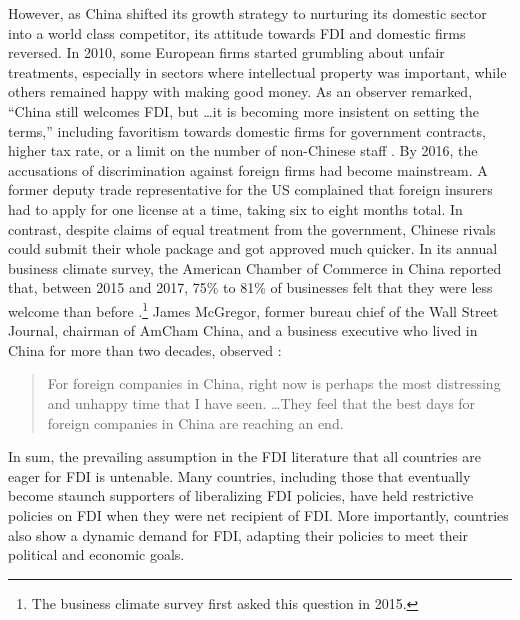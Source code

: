 However, as China shifted its growth strategy to nurturing its domestic sector
into a world class competitor, its attitude towards FDI and domestic firms
reversed. In 2010, some European firms started grumbling about unfair
treatments, especially in sectors where intellectual property was important,
while others remained happy with making good money. As an observer remarked,
``China still welcomes FDI, but \ldots it is becoming more insistent on setting
the terms,'' including favoritism towards domestic firms for government
contracts, higher tax rate, or a limit on the number of non-Chinese staff
\citep{Grant2010}. By 2016, the accusations of discrimination against foreign
firms had become mainstream. A former deputy trade representative for the US
complained that foreign insurers had to apply for one license at a time, taking
six to eight months total. In contrast, despite claims of equal treatment from
the government, Chinese rivals could submit their whole package and got approved
much quicker. In its annual business climate survey, the American Chamber of
Commerce in China reported that, between 2015 and 2017, 75\% to 81\% of
businesses felt that they were less welcome than before
\citep[39]{AmCham2018}.\footnote{The business climate survey first asked this
  question in 2015.} James McGregor, former bureau chief of the Wall Street
Journal, chairman of AmCham China, and a business executive who lived in
China for more than two decades, observed \citep{Wu2016}:

\begin{quote}
  For foreign companies in China, right now is perhaps the most distressing and
  unhappy time that I have seen. \ldots They feel that the best days for foreign
  companies in China are reaching an end.
\end{quote}

In sum, the prevailing assumption in the FDI literature that all countries are
eager for FDI is untenable. Many countries, including those that eventually
become staunch supporters of liberalizing FDI policies, have held restrictive
policies on FDI when they were net recipient of FDI. More importantly, countries
also show a dynamic demand for FDI, adapting their policies to meet their
political and economic goals.

